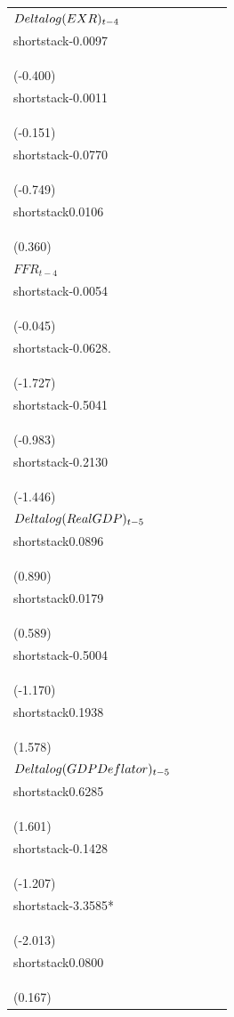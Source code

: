 \begin{table}[H]
\begin{tabular}{l c c c c}
$\\Delta\\log(EXR)_{t-4}$ & \\shortstack{-0.0097\\\\(-0.400)} & \\shortstack{-0.0011\\\\(-0.151)} & \\shortstack{-0.0770\\\\(-0.749)} & \\shortstack{0.0106\\\\(0.360)} \\
$FFR_{t-4}$ & \\shortstack{-0.0054\\\\(-0.045)} & \\shortstack{-0.0628.\\\\(-1.727)} & \\shortstack{-0.5041\\\\(-0.983)} & \\shortstack{-0.2130\\\\(-1.446)} \\
$\\Delta\\log(Real\\ GDP)_{t-5}$ & \\shortstack{0.0896\\\\(0.890)} & \\shortstack{0.0179\\\\(0.589)} & \\shortstack{-0.5004\\\\(-1.170)} & \\shortstack{0.1938\\\\(1.578)} \\
$\\Delta\\log(GDP\\ Deflator)_{t-5}$ & \\shortstack{0.6285\\\\(1.601)} & \\shortstack{-0.1428\\\\(-1.207)} & \\shortstack{-3.3585*\\\\(-2.013)} & \\shortstack{0.0800\\\\(0.167)} \\

\end{tabular}
\end{table}
